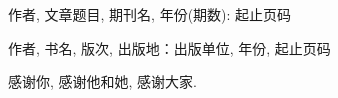 

\reseachresult

\begin{enumerate}[{[1]}]
\item   作者, 文章题目, 期刊名, 年份(期数): 起止页码

\item   作者, 书名, 版次, 出版地：出版单位, 年份, 起止页码
\end{enumerate}


\acknowledgement



感谢你, 感谢他和她, 感谢大家.














  \iflib
  \else
  \newpage
  \cleardoublepage
  \fi

